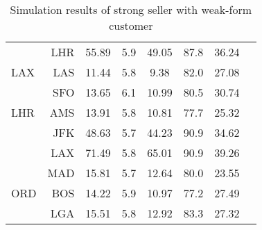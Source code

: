 \begin{table}[h]
\begin{center}
\begin{tabular}{l r c c c c c c}
     &  LHR &  55.89  &    5.9  &  49.05  &   87.8  &  36.24  \\[.5ex]
LAX  &  LAS &  11.44  &    5.8  &   9.38  &   82.0  &  27.08  \\
     &  SFO &  13.65  &    6.1  &  10.99  &   80.5  &  30.74  \\[.5ex]
LHR  &  AMS &  13.91  &    5.8  &  10.81  &   77.7  &  25.32  \\
     &  JFK &  48.63  &    5.7  &  44.23  &   90.9  &  34.62  \\
     &  LAX &  71.49  &    5.8  &  65.01  &   90.9  &  39.26  \\
     &  MAD &  15.81  &    5.7  &  12.64  &   80.0  &  23.55  \\[.5ex]
ORD  &  BOS &  14.22  &    5.9  &  10.97  &   77.2  &  27.49  \\
     &  LGA &  15.51  &    5.8  &  12.92  &   83.3  &  27.32  \\
           \bottomrule
        \end{tabular}
        \caption{Simulation results of strong seller with weak-form customer}
        \label{tbl:resultsStrongWeak}
    \end{center}
\end{table}
